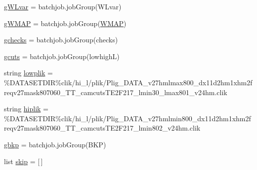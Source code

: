\begin{DoxyCompactItemize}
\mbox{\hyperlink{namespaceplanck_1_1settings__planck__2015_af14b291f012bb6189c510948a7c52308}{g\+W\+Lvar}} = batchjob.\+job\+Group(\textquotesingle{}W\+Lvar\textquotesingle{})
\item 
\mbox{\hyperlink{namespaceplanck_1_1settings__planck__2015_ae5fdb5a94481f70ef633faaa3a970bcd}{g\+W\+M\+AP}} = batchjob.\+job\+Group(\textquotesingle{}\mbox{\hyperlink{namespaceplanck_1_1settings__planck__2015_a11ccfea42b7e06d477594502a93d9e6b}{W\+M\+AP}}\textquotesingle{})
\item 
\mbox{\hyperlink{namespaceplanck_1_1settings__planck__2015_a8c3b9201f47882531301b483017283e4}{gchecks}} = batchjob.\+job\+Group(\textquotesingle{}checks\textquotesingle{})
\item 
\mbox{\hyperlink{namespaceplanck_1_1settings__planck__2015_a731fb05651dadee43a9eef6d5db30366}{gcuts}} = batchjob.\+job\+Group(\textquotesingle{}lowhighL\textquotesingle{})
\item 
string \mbox{\hyperlink{namespaceplanck_1_1settings__planck__2015_aebe58ade5a53b3e57ee1ae6aea62c100}{lowplik}} = \textquotesingle{} \%D\+A\+T\+A\+S\+E\+T\+D\+IR\%clik/hi\+\_\+l/plik/Plig\+\_\+\+D\+A\+T\+A\+\_\+v27hmlmax800\+\_\+dx11d2hm1xhm2freqv27mask807060\+\_\+\+T\+T\+\_\+camcuts\+T\+E2\+F217\+\_\+lmin30\+\_\+lmax801\+\_\+v24hm.\+clik\textquotesingle{}
\item 
string \mbox{\hyperlink{namespaceplanck_1_1settings__planck__2015_a898841e7b5ff1ee2fe88b4360a13089c}{hiplik}} = \textquotesingle{} \%D\+A\+T\+A\+S\+E\+T\+D\+IR\%clik/hi\+\_\+l/plik/Plig\+\_\+\+D\+A\+T\+A\+\_\+v27hmlmin800\+\_\+dx11d2hm1xhm2freqv27mask807060\+\_\+\+T\+T\+\_\+camcuts\+T\+E2\+F217\+\_\+lmin802\+\_\+v24hm.\+clik\textquotesingle{}
\item 
\mbox{\hyperlink{namespaceplanck_1_1settings__planck__2015_a8f44fa7bb7d1b014237c9774b12ae6fa}{gbkp}} = batchjob.\+job\+Group(\textquotesingle{}B\+KP\textquotesingle{})
\item 
list \mbox{\hyperlink{namespaceplanck_1_1settings__planck__2015_a8f5b513f843e4e90297ee4caaca3166f}{skip}} = \mbox{[}$\,$\mbox{]}
\item 

\end{DoxyCompactItemize}
